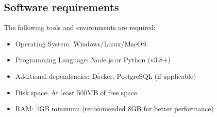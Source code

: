 \documentclass{article}
\begin{document}
\subsection{Software requirements}
The following tools and environments are required:
\begin{itemize}
    \item Operating System: Windows/Linux/MacOS
    \item Programming Language: Node.js or Python (v3.8+)
    \item Additional dependencies: Docker, PostgreSQL (if applicable)
    \item Disk space: At least 500MB of free space
    \item RAM: 4GB minimum (recommended 8GB for better performance)
\end{itemize}
\end{document}
